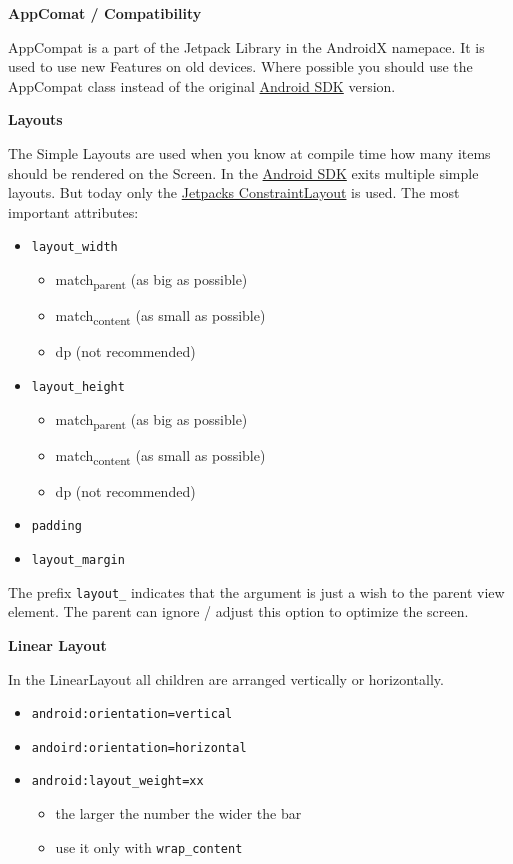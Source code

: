 \documentclass[11pt,twoside,landscape]{article}
\begin{document}
\begin{multicols}{3}
\textbf{AppComat / Compatibility}

AppCompat is a part of the Jetpack Library in the AndroidX namepace.
It is used to use new Features on old devices.
Where possible you should use the AppCompat class instead of the original \href{../../../roam/20210928175951-android_sdk.org}{Android SDK} version.


\textbf{Layouts}

The Simple Layouts are used when you know at compile time how many items should be rendered on the Screen.
In the \href{../../../roam/20210928175951-android_sdk.org}{Android SDK} exits multiple simple layouts. But today only the \href{../../../roam/20211017134616-jetpacks_constraintlayout.org}{Jetpacks ConstraintLayout} is used.
The most important attributes:
\begin{itemize}
\item \texttt{layout\_width}
\begin{itemize}
\item match\textsubscript{parent} (as big as possible)
\item match\textsubscript{content} (as small as possible)
\item dp (not recommended)
\end{itemize}
\item \texttt{layout\_height}
\begin{itemize}
\item match\textsubscript{parent} (as big as possible)
\item match\textsubscript{content} (as small as possible)
\item dp (not recommended)
\end{itemize}
\item \texttt{padding}
\item \texttt{layout\_margin}
\end{itemize}

The prefix \texttt{layout\_} indicates that the argument is just a wish to the parent view element.
The parent can ignore / adjust this option to optimize the screen.

\textbf{Linear Layout}

In the LinearLayout all children are arranged vertically or horizontally.


\begin{itemize}
\item \texttt{android:orientation=vertical}
\item \texttt{andoird:orientation=horizontal}
\item \texttt{android:layout\_weight=xx}
\begin{itemize}
\item the larger the number the wider the bar
\item use it only with \texttt{wrap\_content}
\end{itemize}
\end{itemize}


\end{multicols}
\end{document}
